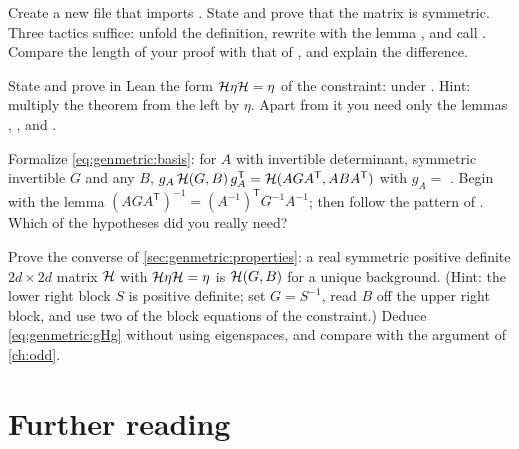\begin{exercise}\label{ex:genmetric:leaneta}
Create a new file that imports . State and
prove that the matrix  is symmetric. Three tactics suffice: unfold the
definition, rewrite with the lemma , and call
. Compare the length of your proof with
that of , and explain the difference.
\end{exercise}

\begin{exercise}\label{ex:genmetric:leanHetaH}
State and prove in Lean the form $\mathcal{H}\eta\mathcal{H}=\eta$ of the constraint:
 under .
Hint: multiply the theorem  from the left by $\eta$. Apart
from it you need only the lemmas , ,
 and .
\end{exercise}

\begin{exercise}\label{ex:genmetric:leanbasis}
Formalize \eqref{eq:genmetric:basis}: for $A$ with invertible determinant, symmetric
invertible $G$ and any $B$,
$g_A\,\mathcal{H}(G,B)\,g_A^{\mathsf T}=\mathcal{H}(AGA^{\mathsf T},ABA^{\mathsf T})$ with
$g_A=$ . Begin with the lemma
$(AGA^{\mathsf T})^{-1}=(A^{-1})^{\mathsf T}G^{-1}A^{-1}$; then follow the pattern of
. Which of the hypotheses did you really need?
\end{exercise}

\begin{exercise}[$\star\star\star$]\label{ex:genmetric:char}
Prove the converse of \cref{sec:genmetric:properties}: a real symmetric positive definite
$2d\times2d$ matrix $\mathcal{H}$ with $\mathcal{H}\eta\mathcal{H}=\eta$ is $\mathcal{H}(G,B)$ for a unique background.
(Hint: the lower right block $S$ is positive definite; set $G=S^{-1}$, read $B$ off the
upper right block, and use two of the block equations of the constraint.) Deduce
\eqref{eq:genmetric:gHg} without using eigenspaces, and compare with the argument of
\cref{ch:odd}.
\end{exercise}

\section*{Further reading}

